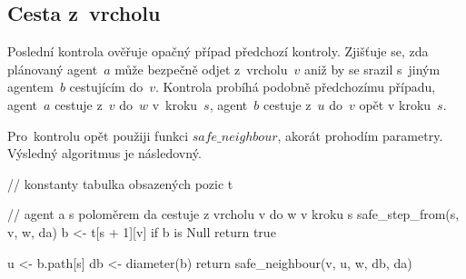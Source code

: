\subsection{Cesta z~vrcholu}\label{subsec:cesta_z_vrcholu}

Poslední kontrola ověřuje opačný případ předchozí kontroly.
Zjišťuje se, zda plánovaný agent~$a$ může bezpečně odjet z~vrcholu~$v$
aniž by se srazil s~jiným agentem~$b$ cestujícím do~$v$.
Kontrola probíhá podobně předchozímu případu, agent~$a$ cestuje z~$v$ do~$w$ v~kroku~$s$,
agent~$b$ cestuje z~$u$ do~$v$ opět v kroku~$s$.

Pro~kontrolu opět použiji funkci $safe\_neighbour$, akorát prohodím parametry.
Výsledný algoritmus je následovný.
\begin{code}
// konstanty tabulka obsazených pozic t

// agent a s poloměrem da cestuje z vrcholu v do w v kroku s
safe_step_from(s, v, w, da)
  b <- t[s + 1][v]
  if b is Null return true

  u <- b.path[s]
  db <- diameter(b)
  return safe_neighbour(v, u, w, db, da)
\end{code}
